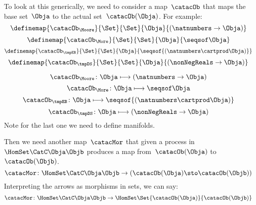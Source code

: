 To look at this generically, we need to consider a map~$\catacOb$ that maps the base set~$\Obja$ to the actual set~$\catacOb(\Obja)$. For example:
\begin{equation}
    \definemap{\catacOb_{\Moore}}{\Set}{\Set}{\Obja}{(\natnumbers \to \Obja)}
\end{equation}
\begin{equation}
    \definemap{\catacOb_{\More}}{\Set}{\Set}{\Obja}{\seqsof \Obja}
\end{equation}
\begin{equation}
    \definemap{\catacOb_{\tmpEB}}{\Set}{\Set}{\Obja}{\seqsof{(\natnumbers \cartprod \Obja)}}
\end{equation}
\begin{equation}
    \definemap{\catacOb_{\tmpDS}}{\Set}{\Set}{\Obja}{(\nonNegReals \to \Obja)}
\end{equation}

\begin{equation}
    \label{eq:phi-moore}
    {\catacOb_{\Moore}}\colon{\Obja}\longmapsto{(\natnumbers \to \Obja)}
\end{equation}
\begin{equation}
    \label{eq:phi-more}
    {\catacOb_{\More}}\colon{\Obja}\longmapsto{\seqsof \Obja}
\end{equation}
\begin{equation}
    \label{eq:phi-EB}
    {\catacOb_{\tmpEB}}\colon{\Obja}\longmapsto{\seqsof{(\natnumbers \cartprod \Obja)}}
\end{equation}
\begin{equation}
    \label{eq:phi-DS}
    {\catacOb_{\tmpDS}}\colon{\Obja}\longmapsto{(\nonNegReals \to \Obja)}
\end{equation}
Note for the last one we need to define manifolds.

Then we need another map~$\catacMor$ that given a process in~$\HomSet\CatC\Obja\Objb$
produces a map from~$\catacOb(\Obja)$ to~$\catacOb(\Objb)$.
%
\begin{equation}
    \label{eq:gamma-1}
    \catacMor\colon \HomSet\CatC\Obja\Objb \to  (\catacOb(\Obja) \sto \catacOb(\Objb))
\end{equation}
%
Interpreting the arrows as morphisms in sets, we can say:
\begin{equation}
    \label{eq:gamma-2}
    \catacMor\colon \HomSet\CatC\Obja\Objb \to  \HomSet\Set{\catacOb(\Obja)}{\catacOb(\Objb) }
\end{equation}


